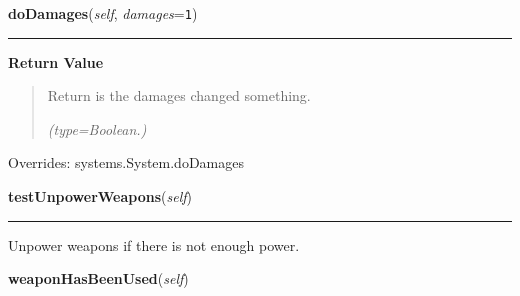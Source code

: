     \vspace{0.5ex}

\hspace{.8\funcindent}\begin{boxedminipage}{\funcwidth}

    \raggedright \textbf{doDamages}(\textit{self}, \textit{damages}={\tt 1})

    \vspace{-1.5ex}

    \rule{\textwidth}{0.5\fboxrule}
\setlength{\parskip}{2ex}
\setlength{\parskip}{1ex}
      \textbf{Return Value}
    \vspace{-1ex}

      \begin{quote}
      Return is the damages changed something.

      {\it (type=Boolean.)}

      \end{quote}

      Overrides: systems.System.doDamages

    \end{boxedminipage}

    \label{systems:WeaponControl:testUnpowerWeapons}

    \vspace{0.5ex}

\hspace{.8\funcindent}\begin{boxedminipage}{\funcwidth}

    \raggedright \textbf{testUnpowerWeapons}(\textit{self})

    \vspace{-1.5ex}

    \rule{\textwidth}{0.5\fboxrule}
\setlength{\parskip}{2ex}
    Unpower weapons if there is not enough power.

\setlength{\parskip}{1ex}
    \end{boxedminipage}

    \label{systems:WeaponControl:weaponHasBeenUsed}

    \vspace{0.5ex}

\hspace{.8\funcindent}\begin{boxedminipage}{\funcwidth}

    \raggedright \textbf{weaponHasBeenUsed}(\textit{self})

\setlength{\parskip}{2ex}
\setlength{\parskip}{1ex}
    \end{boxedminipage}

